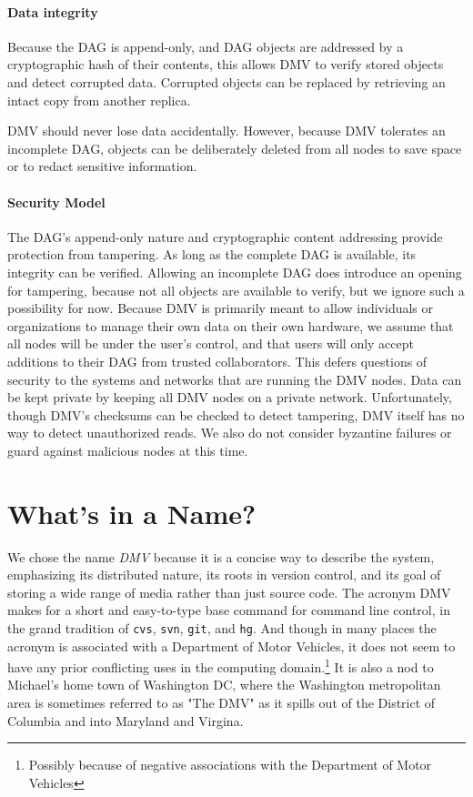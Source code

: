 \paragraph{Data integrity}

Because the \gls{DAG} is append-only, and \gls{DAG} objects are addressed by a
cryptographic hash of their contents, this allows \gls{DMV} to verify stored
objects and detect corrupted data. Corrupted objects can be replaced by
retrieving an intact copy from another replica.

\gls{DMV} should never lose data accidentally. However, because \gls{DMV}
tolerates an incomplete \gls{DAG}, objects can be deliberately deleted from all
nodes to save space or to redact sensitive information.


\paragraph{Security Model}

The \gls{DAG}'s append-only nature and cryptographic content addressing provide
protection from tampering. As long as the complete \gls{DAG} is available, its
integrity can be verified. Allowing an incomplete \gls{DAG} does introduce an
opening for tampering, because not all objects are available to verify, but we
ignore such a possibility for now. Because \gls{DMV} is primarily meant to allow
individuals or organizations to manage their own data on their own hardware, we
assume that all nodes will be under the user's control, and that users will only
accept additions to their \gls{DAG} from trusted collaborators. This defers
questions of security to the systems and networks that are running the \gls{DMV}
nodes. Data can be kept private by keeping all \gls{DMV} nodes on a private
network. Unfortunately, though \gls{DMV}'s checksums can be checked to detect
tampering, \gls{DMV} itself has no way to detect unauthorized reads. We also do
not consider byzantine failures or guard against malicious nodes at this time.

%


\section{What's in a Name?}

We chose the name \emph{\acrlong{DMV}} because it is a concise way to describe
the system, emphasizing its distributed nature, its roots in version control,
and its goal of storing a wide range of media rather than just source code. The
acronym \gls{DMV} makes for a short and easy-to-type base command for command
line control, in the grand tradition of \lstinline{cvs}, \lstinline{svn},
\lstinline{git}, and \lstinline{hg}. And though in many places the acronym is
associated with a Department of Motor Vehicles, it does not seem to have any
prior conflicting uses in the computing domain.\footnote{Possibly because of
negative associations with the Department of Motor Vehicles} It is also a nod to
Michael's home town of Washington DC, where the Washington metropolitan area is
sometimes referred to as "The DMV" as it spills out of the District of Columbia
and into Maryland and Virgina.
